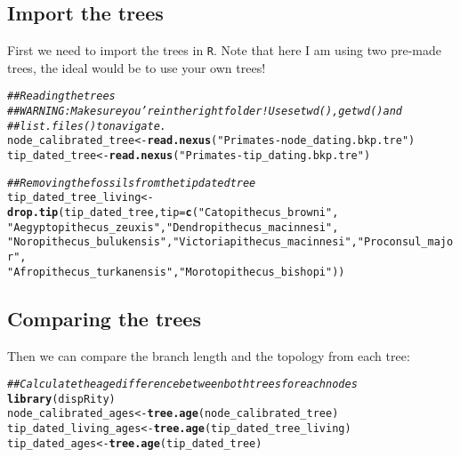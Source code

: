 \documentclass{article}\usepackage[]{graphicx}\usepackage[]{color}
\makeatletter
\newcommand{\hlstr}[1]{\textcolor[rgb]{0.192,0.494,0.8}{#1}}%
\newcommand{\hlcom}[1]{\textcolor[rgb]{0.678,0.584,0.686}{\textit{#1}}}%
\newcommand{\hlstd}[1]{\textcolor[rgb]{0.345,0.345,0.345}{#1}}%
\newcommand{\hlkwb}[1]{\textcolor[rgb]{0.69,0.353,0.396}{#1}}%
\newcommand{\hlkwc}[1]{\textcolor[rgb]{0.333,0.667,0.333}{#1}}%
\newcommand{\hlkwd}[1]{\textcolor[rgb]{0.737,0.353,0.396}{\textbf{#1}}}%
\newenvironment{kframe}{%
 \def\at@end@of@kframe{}%
 \ifinner\ifhmode%
  \def\at@end@of@kframe{\end{minipage}}%
  \begin{minipage}{\columnwidth}%
 \fi\fi%
 \def\FrameCommand##1{\hskip\@totalleftmargin \hskip-\fboxsep
 \colorbox{shadecolor}{##1}\hskip-\fboxsep
     \hskip-\linewidth \hskip-\@totalleftmargin \hskip\columnwidth}%
 \MakeFramed {\advance\hsize-\width
   \@totalleftmargin\z@ \linewidth\hsize
   \@setminipage}}%
 {\par\unskip\endMakeFramed%
 \at@end@of@kframe}
\newenvironment{knitrout}{}{} %
\makeatother
\begin{document}
\subsection{Import the trees}
First we need to import the trees in \texttt{R}.
Note that here I am using two pre-made trees, the ideal would be to use your own trees!
\begin{knitrout}
\color{fgcolor}\begin{kframe}
\begin{alltt}
\hlcom{## Reading the trees}
\hlcom{## WARNING: Make sure you're in the right folder! Use setwd(), getwd() and}
\hlcom{## list.files() to navigate.}
\hlstd{node_calibrated_tree} \hlkwb{<-} \hlkwd{read.nexus}\hlstd{(}\hlstr{"Primates-node_dating.bkp.tre"}\hlstd{)}
\hlstd{tip_dated_tree}       \hlkwb{<-} \hlkwd{read.nexus}\hlstd{(}\hlstr{"Primates-tip_dating.bkp.tre"}\hlstd{)}

\hlcom{## Removing the fossils from the tip dated tree}
\hlstd{tip_dated_tree_living} \hlkwb{<-} \hlkwd{drop.tip}\hlstd{(tip_dated_tree,} \hlkwc{tip} \hlstd{=} \hlkwd{c}\hlstd{(}\hlstr{"Catopithecus_browni"}\hlstd{,}
  \hlstr{"Aegyptopithecus_zeuxis"}\hlstd{,} \hlstr{"Dendropithecus_macinnesi"}\hlstd{,}
  \hlstr{"Noropithecus_bulukensis"}\hlstd{,} \hlstr{"Victoriapithecus_macinnesi"}\hlstd{,} \hlstr{"Proconsul_major"}\hlstd{,}
  \hlstr{"Afropithecus_turkanensis"}\hlstd{,} \hlstr{"Morotopithecus_bishopi"}\hlstd{))}
\end{alltt}
\end{kframe}
\end{knitrout}

\subsection{Comparing the trees}
Then we can compare the branch length and the topology from each tree:

\begin{knitrout}
\color{fgcolor}\begin{kframe}
\begin{alltt}
\hlcom{## Calculate the age difference between both trees for each nodes}
\hlkwd{library}\hlstd{(dispRity)}
\hlstd{node_calibrated_ages}  \hlkwb{<-} \hlkwd{tree.age}\hlstd{(node_calibrated_tree)}
\hlstd{tip_dated_living_ages} \hlkwb{<-} \hlkwd{tree.age}\hlstd{(tip_dated_tree_living)}
\hlstd{tip_dated_ages}        \hlkwb{<-} \hlkwd{tree.age}\hlstd{(tip_dated_tree)}
\end{alltt}
\end{kframe}
\end{knitrout}
\end{document}
